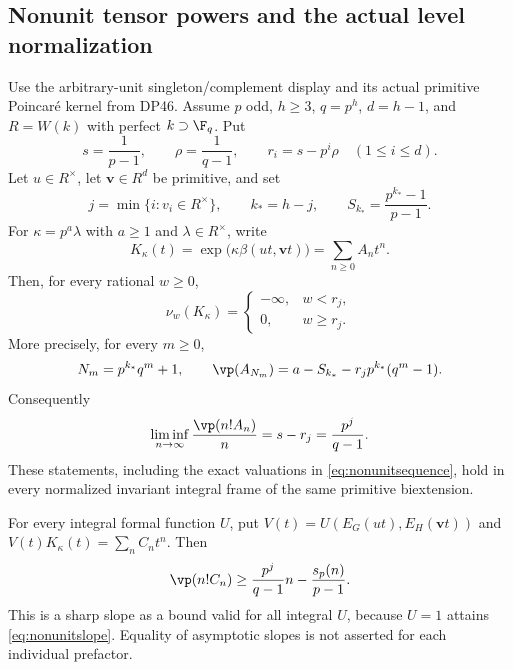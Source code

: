 \subsection{Nonunit tensor powers and the actual level normalization}

\begin{theorem}\label{DP50}
Use the arbitrary-unit singleton/complement display and its actual primitive Poincar\'e kernel from DP46. Assume $p$ odd, $h\ge3$, $q=p^h$, $d=h-1$, and $R=W(k)$ with perfect $k\supset\F_q$. Put
\[
 s=\frac1{p-1},\qquad \rho=\frac1{q-1},\qquad
 r_i=s-p^i\rho\quad(1\le i\le d).
\]
Let $u\in R^\times$, let $\mathbf v\in R^d$ be primitive, and set
\[
 j=\min\{i:v_i\in R^\times\},\qquad
 k_*=h-j,\qquad S_{k_*}=\frac{p^{k_*}-1}{p-1}.
\]
For $\kappa=p^a\lambda$ with $a\ge1$ and $\lambda\in R^\times$, write
\[
 K_\kappa(t)=\exp\bigl(\kappa\beta(ut,\mathbf vt)\bigr)
       =\sum_{n\ge0}A_nt^n.
\]
Then, for every rational $w\ge0$,
\begin{equation}\label{eq:nonunitradius}
 \nu_w(K_\kappa)=
 \begin{cases}-\infty,&w<r_j,\\0,&w\ge r_j.\end{cases}
\end{equation}
More precisely, for every $m\ge0$,
\begin{equation}\label{eq:nonunitsequence}
 N_m=p^{k_*}q^m+1,\qquad
 \vp(A_{N_m})=a-S_{k_*}-r_jp^{k_*}(q^m-1).
\end{equation}
Consequently
\begin{equation}\label{eq:nonunitslope}
 \liminf_{n\to\infty}\frac{\vp(n!A_n)}n
       =s-r_j=\frac{p^j}{q-1}.
\end{equation}
These statements, including the exact valuations in
\eqref{eq:nonunitsequence}, hold in every normalized invariant integral frame of the same primitive biextension.

For every integral formal function $U$, put
$V(t)=U(E_G(ut),E_H(\mathbf vt))$ and
$V(t)K_\kappa(t)=\sum_n C_nt^n$. Then
\begin{equation}\label{eq:nonunitprefactor}
 \vp(n!C_n)\ge\frac{p^j}{q-1}n-\frac{s_p(n)}{p-1}.
\end{equation}
This is a sharp slope as a bound valid for all integral $U$, because $U=1$ attains \eqref{eq:nonunitslope}. Equality of asymptotic slopes is not asserted for each individual prefactor.
\end{theorem}

